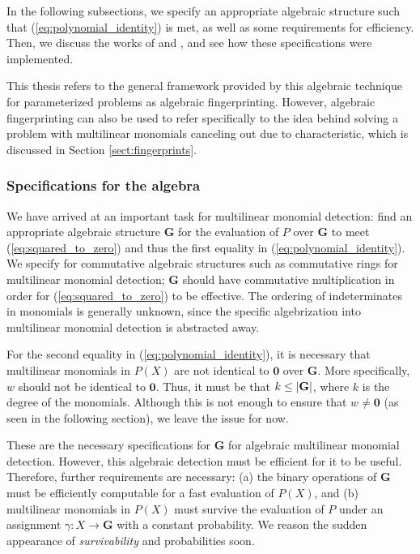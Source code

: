 In the following subsections, we specify an appropriate algebraic structure such that 
(\ref{eq:polynomial_identity}) is met, as well as some requirements for efficiency. 
Then, we discuss the works of \citeauthor{Koutis08} 
and \citeauthor{Williams09} \cite{Koutis08, Williams09}, 
and see how these specifications were implemented.

This thesis refers to the general framework provided 
by this algebraic technique for parameterized problems \cite{KouWil09, KouWil15} as 
algebraic fingerprinting. However, algebraic fingerprinting can also 
be used to refer specifically to the idea behind solving a problem 
with multilinear monomials canceling out due to characteristic,  
which is discussed in Section \ref{sect:fingerprints}.

\subsubsection{Specifications for the algebra}
\label{sect:algebra_specs}

We have arrived at an important task for multilinear monomial detection: 
find an appropriate algebraic structure $\mathbf{G}$ for 
the evaluation of $P$ over $\mathbf{G}$ to meet 
(\ref{eq:squared_to_zero}) and thus the first equality in (\ref{eq:polynomial_identity}). 
We specify for commutative algebraic structures such as 
commutative rings for multilinear monomial detection; 
$\mathbf{G}$ should have commutative multiplication in order for (\ref{eq:squared_to_zero}) 
to be effective. The ordering of indeterminates in monomials is generally unknown, 
since the specific algebrization into multilinear monomial detection 
is abstracted away. %

For the second equality in (\ref{eq:polynomial_identity}), it is necessary that multilinear 
monomials in $P(X)$ are not identical to $\mathbf{0}$ over $\mathbf{G}$. 
More specifically, 
$w$ should not be identical to $\mathbf{0}$. 
Thus, it must be that $k \leq {\left\vert\mathbf{G}\right\vert}$, where $k$ is the degree of the monomials. 
Although this is not enough to ensure that $w \neq \mathbf{0}$ (as seen in the following section), 
we leave the issue for now.

These are the necessary specifications for $\mathbf{G}$ for algebraic multilinear monomial detection. 
However, this algebraic detection must be efficient for it to be useful. 
Therefore, further requirements are necessary: (a) the binary operations of $\mathbf{G}$ 
must be efficiently computable %
for a fast evaluation of $P(X)$, and (b) multilinear monomials in $P(X)$ must 
survive the evaluation of $P$ under an assignment $\gamma \colon X \to \mathbf{G}$ 
with a constant probability. We reason the 
sudden appearance of \emph{survivability} and probabilities soon.


